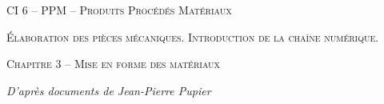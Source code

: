 \documentclass[11pt,oneside]{article}
\begin{document}
\pagestyle{fancy}
\renewcommand{\headrulewidth}{0pt}

\fancyhead{}

\fancyhead[C]{\rule{12cm}{.5pt}}


\renewcommand{\footrulewidth}{0.2pt}

\fancyfoot[C]{\footnotesize{\bfseries \thepage}}



\begin{center}
 \huge\textsc{CI 6 -- PPM -- Produits Procédés Matériaux}

 \large\textsc{Élaboration des pièces mécaniques. Introduction de la chaîne numérique.}
\end{center}

\begin{center}
 \LARGE\textsc{Chapitre 3 -- Mise en forme des matériaux}
\end{center}

\begin{flushright}
\textit{D'après documents de Jean-Pierre Pupier}
\end{flushright}

\vspace{.5cm}
\end{document}
